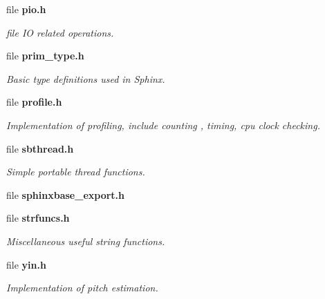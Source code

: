 \begin{DoxyCompactItemize}
file {\bf pio.\+h}
\begin{DoxyCompactList}\small\item\em file I\+O related operations. \end{DoxyCompactList}\item 
file {\bf prim\+\_\+type.\+h}
\begin{DoxyCompactList}\small\item\em Basic type definitions used in Sphinx. \end{DoxyCompactList}\item 
file {\bf profile.\+h}
\begin{DoxyCompactList}\small\item\em Implementation of profiling, include counting , timing, cpu clock checking. \end{DoxyCompactList}\item 
file {\bf sbthread.\+h}
\begin{DoxyCompactList}\small\item\em Simple portable thread functions. \end{DoxyCompactList}\item 
file {\bfseries sphinxbase\+\_\+export.\+h}
\item 
file {\bf strfuncs.\+h}
\begin{DoxyCompactList}\small\item\em Miscellaneous useful string functions. \end{DoxyCompactList}\item 
file {\bf yin.\+h}
\begin{DoxyCompactList}\small\item\em Implementation of pitch estimation. \end{DoxyCompactList}\end{DoxyCompactItemize}
